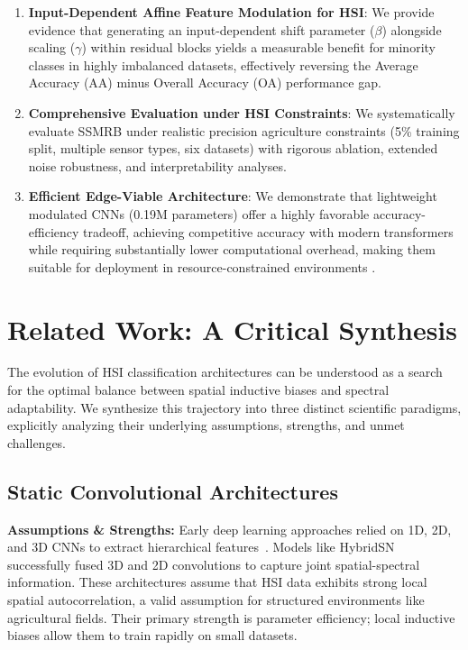 \documentclass[pdflatex,sn-mathphys-num]{sn-jnl}
\theoremstyle{thmstyleone}
\theoremstyle{thmstyletwo}
\theoremstyle{thmstylethree}
\begin{document}
\begin{enumerate}
\item \textbf{Input-Dependent Affine Feature Modulation for HSI}: We provide evidence that generating an input-dependent shift parameter ($\beta$) alongside scaling ($\gamma$) within residual blocks yields a measurable benefit for minority classes in highly imbalanced datasets, effectively reversing the Average Accuracy (AA) minus Overall Accuracy (OA) performance gap.
\item \textbf{Comprehensive Evaluation under HSI Constraints}: We systematically evaluate SSMRB under realistic precision agriculture constraints (5\% training split, multiple sensor types, six datasets) with rigorous ablation, extended noise robustness, and interpretability analyses.
\item \textbf{Efficient Edge-Viable Architecture}: We demonstrate that lightweight modulated CNNs (0.19M parameters) offer a highly favorable accuracy-efficiency tradeoff, achieving competitive accuracy with modern transformers~\cite{sun2025advances} while requiring substantially lower computational overhead, making them suitable for deployment in resource-constrained environments \cite{wang2025mslkacnn,song2024lightweight,ding2024lightweight,chen2025adaptive,liu2024multi}.
 \end{enumerate}

\section{Related Work: A Critical Synthesis}

The evolution of HSI classification architectures can be understood as a search for the optimal balance between spatial inductive biases and spectral adaptability. We synthesize this trajectory into three distinct scientific paradigms, explicitly analyzing their underlying assumptions, strengths, and unmet challenges.

\subsection{Static Convolutional Architectures}
\textbf{Assumptions \& Strengths:} Early deep learning approaches relied on 1D, 2D, and 3D CNNs to extract hierarchical features~\cite{hu2015deep,makantasis2015deep,li2017spectral}. Models like HybridSN~\cite{roy2020hybridsn} successfully fused 3D and 2D convolutions to capture joint spatial-spectral information. These architectures assume that HSI data exhibits strong local spatial autocorrelation, a valid assumption for structured environments like agricultural fields. Their primary strength is parameter efficiency; local inductive biases allow them to train rapidly on small datasets.
\end{document}
